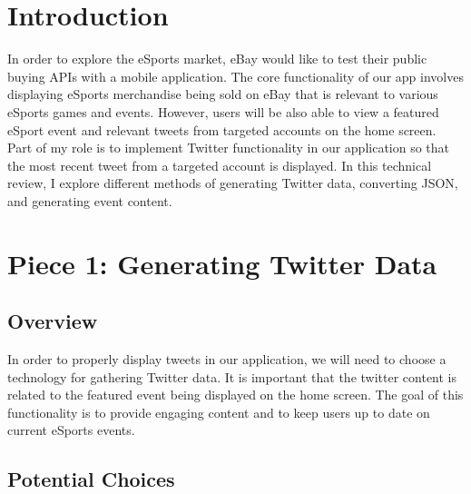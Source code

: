 \documentclass[onecolumn, draftclsnofoot,10pt, compsoc]{IEEEtran}
\begin{document}
\begin{titlepage}
\begin{singlespace}
\begin{abstract}
        \end{abstract}     
    \end{singlespace}
\end{titlepage}
\newpage
{}
\tableofcontents
\clearpage

\section{Introduction}
In order to explore the eSports market, eBay would like to test their public buying APIs with a mobile application. 
The core functionality of our app involves displaying eSports merchandise being sold on eBay that is relevant to various eSports games and events. 
However, users will be also able to view a featured eSport event and relevant tweets from targeted accounts on the home screen. 
Part of my role is to implement Twitter functionality in our application so that the most recent tweet from a targeted account is displayed.
In this technical review, I explore different methods of generating Twitter data, converting JSON, and generating event content. 

\section{Piece 1: Generating Twitter Data}
\subsection{Overview}
In order to properly display tweets in our application, we will need to choose a technology for gathering Twitter data.
It is important that the twitter content is related to the featured event being displayed on the home screen.
The goal of this functionality is to provide engaging content and to keep users up to date on current eSports events. 
\subsection{Potential Choices}
\end{document}
